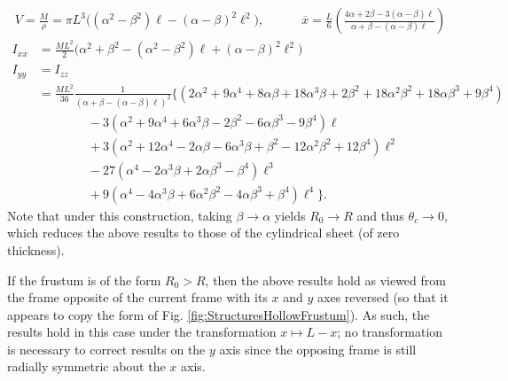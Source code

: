 \documentclass[11pt,dvipsnames]{thesis}
\begin{document}
\begin{gather}
V = \frac{M}{\rho} = \pi L^3 \big((\alpha^2 - \beta^2)\ell - (\alpha - \beta)^2\ell^2\big), \qquad\quad \overline{x} = \frac{L}{6}\left(\frac{4\alpha + 2\beta - 3(\alpha - \beta)\ell}{\alpha + \beta - (\alpha - \beta)\ell}\right) %
\end{gather}
\begin{align}
I_{xx} &= \frac{M L^2}{2} \big(\alpha^2 + \beta^2 - (\alpha^2 - \beta^2) \ell + (\alpha - \beta)^2 \ell^2\big) \\
I_{yy} &= I_{zz} \\\
&= \frac{M L^2}{36} \frac{1}{(\alpha + \beta - (\alpha - \beta)\ell)^2}\Big\{(2\alpha^2 + 9\alpha^4 + 8\alpha\beta + 18\alpha^3\beta + 2\beta^2 + 18\alpha^2\beta^2 + 18\alpha\beta^3 + 9\beta^4) \nonumber \\
&\qquad\qquad - 3(\alpha^2 + 9\alpha^4 + 6\alpha^3\beta - 2\beta^2 - 6\alpha\beta^3 - 9\beta^4)\ell \nonumber \\
&\qquad\qquad + 3(\alpha^2 + 12\alpha^4 - 2\alpha\beta - 6\alpha^3\beta + \beta^2 - 12\alpha^2\beta^2 + 12\beta^4)\ell^2 \nonumber \\
&\qquad\qquad - 27(\alpha^4 - 2\alpha^3\beta + 2\alpha\beta^3 - \beta^4)\ell^3 \nonumber \\
&\qquad\qquad + 9(\alpha^4 - 4\alpha^3\beta + 6\alpha^2\beta^2 - 4\alpha\beta^3 + \beta^4)\ell^4\Big\}.
\end{align}
Note that under this construction, taking $\beta \to \alpha$ yields $R_0 \to R$ and thus $\theta_c \to 0$, which reduces the above results to those of the cylindrical sheet (of zero thickness).

If the frustum is of the form $R_0 > R$, then the above results hold as viewed from the frame opposite of the current frame with its $x$ and $y$ axes reversed (so that it appears to copy the form of Fig. \ref{fig:StructuresHollowFrustum}). As such, the results hold in this case under the transformation $x \mapsto L - x$; no transformation is necessary to correct results on the $y$ axis since the opposing frame is still radially symmetric about the $x$ axis.
\end{document}
